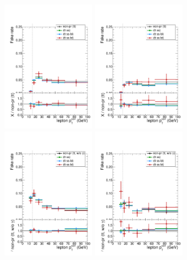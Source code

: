 \begin{figure}[htb]
	\centering 
\includegraphics[width=0.35\textwidth]{plots_fakerate/measurement/mu_ttvars_barrel}
\includegraphics[width=0.35\textwidth]{plots_fakerate/measurement/mu_ttvars_endcap} \\
\includegraphics[width=0.35\textwidth]{plots_fakerate/measurement/el_ttvarsNC_barrel}
\includegraphics[width=0.35\textwidth]{plots_fakerate/measurement/el_ttvarsNC_endcap}

\end{figure}
